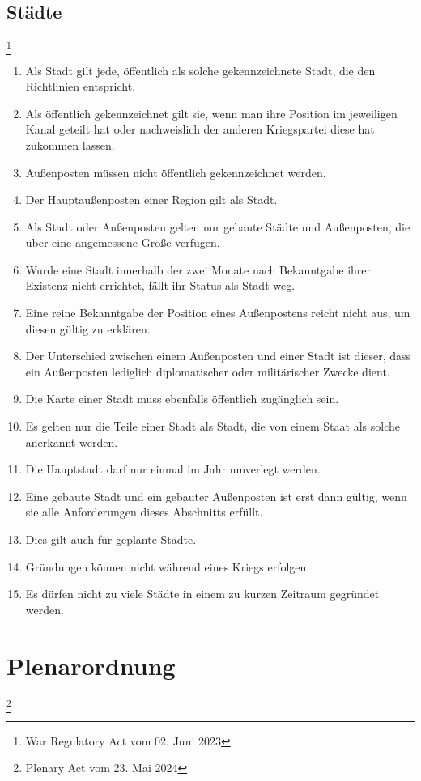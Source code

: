 \documentclass{article}
\begin{document}
\subsection{Städte}\footnote{War Regulatory Act vom 02. Juni 2023}
\begin{enumerate}[(1)]
	\item Als Stadt gilt jede, öffentlich als solche gekennzeichnete Stadt, die den Richtlinien entspricht.
	\item Als öffentlich gekennzeichnet gilt sie, wenn man ihre Position im jeweiligen Kanal geteilt hat oder nachweislich der anderen Kriegspartei diese hat zukommen lassen.
	\item Außenposten müssen nicht öffentlich gekennzeichnet werden.
	\item Der Hauptaußenposten einer Region gilt als Stadt.
	\item Als Stadt oder Außenposten gelten nur gebaute Städte und Außenposten, die über eine angemessene Größe verfügen.
	\item Wurde eine Stadt innerhalb der zwei Monate nach Bekanntgabe ihrer Existenz nicht errichtet, fällt ihr Status als Stadt weg.
	\item Eine reine Bekanntgabe der Position eines Außenpostens reicht nicht aus, um diesen gültig zu erklären.
	\item Der Unterschied zwischen einem Außenposten und einer Stadt ist dieser, dass ein Außenposten lediglich diplomatischer oder militärischer Zwecke dient.
	\item Die Karte einer Stadt muss ebenfalls öffentlich zugänglich sein.
	\item Es gelten nur die Teile einer Stadt als Stadt, die von einem Staat als solche anerkannt werden.
	\item Die Hauptstadt darf nur einmal im Jahr umverlegt werden.
	\item Eine gebaute Stadt und ein gebauter Außenposten ist erst dann gültig, wenn sie alle Anforderungen dieses Abschnitts erfüllt.
	\item Dies gilt auch für geplante Städte.
	\item Gründungen können nicht während eines Kriegs erfolgen.
	\item Es dürfen nicht zu viele Städte in einem zu kurzen Zeitraum gegründet werden.
\end{enumerate}

\section{Plenarordnung}\footnote{Plenary Act vom 23. Mai 2024}
\end{document}
